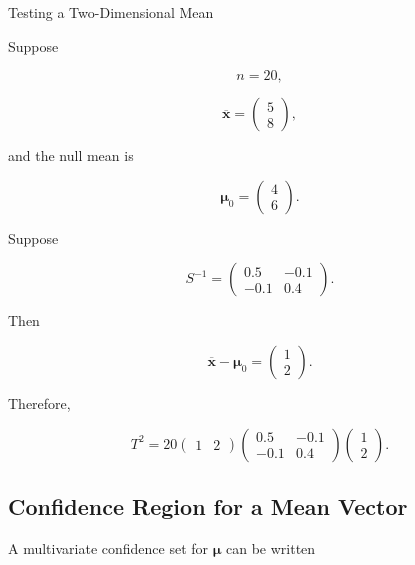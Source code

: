 \begin{workedexamplebox}{Testing a Two-Dimensional Mean}

Suppose

\[
n=20,
\]

\[
\overline{\mathbf{x}}
=
\begin{pmatrix}
5\\
8
\end{pmatrix},
\]

and the null mean is

\[
\boldsymbol{\mu}_0
=
\begin{pmatrix}
4\\
6
\end{pmatrix}.
\]

Suppose

\[
S^{-1}
=
\begin{pmatrix}
0.5&-0.1\\
-0.1&0.4
\end{pmatrix}.
\]

Then

\[
\overline{\mathbf{x}}
-
\boldsymbol{\mu}_0
=
\begin{pmatrix}
1\\
2
\end{pmatrix}.
\]

Therefore,

\begin{answerbox}
\[
\boxed{
T^2
=
20
\begin{pmatrix}
1&2
\end{pmatrix}
\begin{pmatrix}
0.5&-0.1\\
-0.1&0.4
\end{pmatrix}
\begin{pmatrix}
1\\
2
\end{pmatrix}.
}
\]
\end{answerbox}

\end{workedexamplebox}

\subsection{Confidence Region for a Mean Vector}
\label{subsec:confidence-region-mean-vector}

A multivariate confidence set for \(\boldsymbol{\mu}\) can be written

